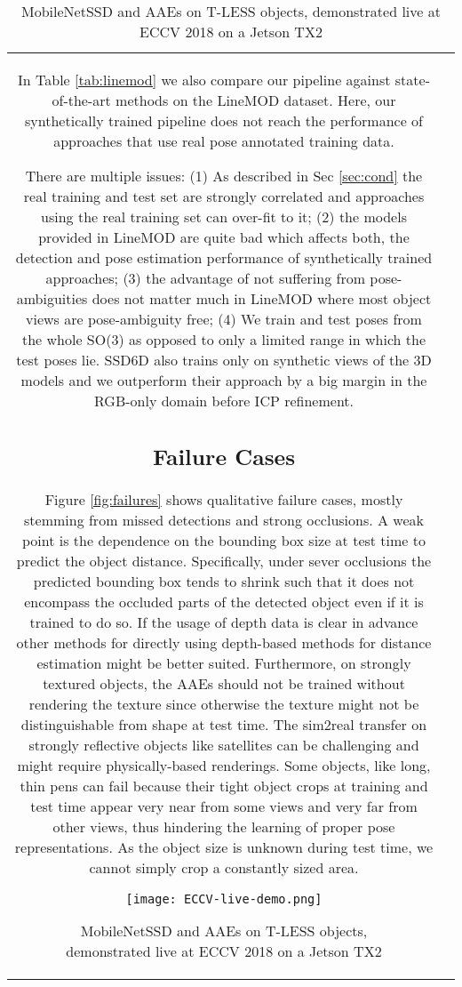 \begin{table}[t]
\begin{tabular}{cc}
	In Table \ref{tab:linemod} we also compare our pipeline against state-of-the-art methods on the LineMOD dataset. Here, our synthetically trained pipeline does not reach the performance of approaches that use real pose annotated training data. 
	
	
	There are multiple issues: (1) As described in Sec \ref{sec:cond} the real training and test set are strongly correlated and approaches using the real training set can over-fit to it; (2) the models provided in LineMOD are quite bad which affects both, the detection and pose estimation performance of synthetically trained approaches; (3) the advantage of not suffering from pose-ambiguities does not matter much in LineMOD where most object views are pose-ambiguity free; (4) We train and test poses from the whole SO(3) as opposed to only a limited range in which the test poses lie.
	SSD6D also trains only on synthetic views of the 3D models and we outperform their approach by a big margin in the RGB-only domain before \gls{ICP} refinement. 
	
	\subsection{Failure Cases}
	Figure \ref{fig:failures} shows qualitative failure cases, mostly stemming from missed detections and strong occlusions. A weak point is the dependence on the bounding box size at test time to predict the object distance. Specifically, under sever occlusions the predicted bounding box tends to shrink such that it does not encompass the occluded parts of the detected object even if it is trained to do so.
	If the usage of depth data is clear in advance other methods for directly using depth-based methods for distance estimation might be better suited. Furthermore, on strongly textured objects, the AAEs should not be trained without rendering the texture since otherwise the texture might not be distinguishable from shape at test time. The sim2real transfer on strongly reflective objects like satellites can be challenging and might require physically-based renderings.
	Some objects, like long, thin pens can fail because their tight object crops at training and test time appear very near from some views and very far from other views, thus hindering the learning of proper pose representations. As the object size is unknown during test time, we cannot simply crop a constantly sized area. 
	

\begin{figure}[t]\centering
	\captionsetup{width=0.99\columnwidth}
	\texttt{[image: ECCV-live-demo.png]}
	\caption{MobileNetSSD and \glspl{AAE} on T-LESS objects, demonstrated live at ECCV 2018 on a Jetson TX2}
	\label{fig:ECCV-live-demo}
\end{figure}


\end{tabular}
\end{table}
